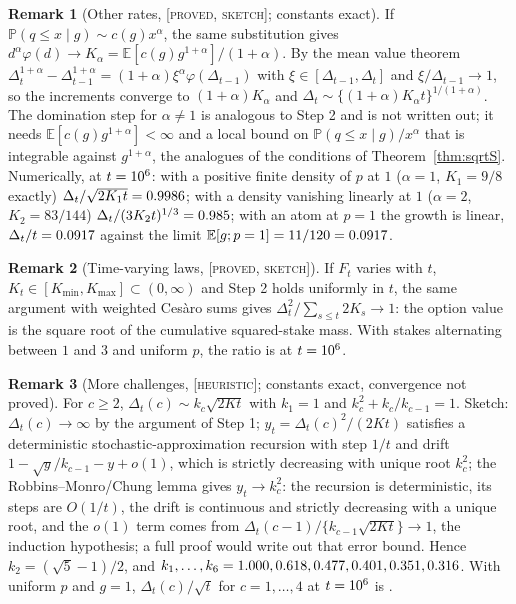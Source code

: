 \documentclass[aoas]{imsart}
\theoremstyle{plain}
\theoremstyle{definition}
\newtheorem{remark}{Remark}
\newcommand{\E}{\mathbb{E}}
\newcommand{\Prob}{\mathbb{P}}
\newcommand{\status}[1]{\textup{[\textsc{#1}]}}
\begin{document}
\begin{remark}[Other rates, \status{proved, sketch}; constants exact]\label{rem:alpha}
If $\Prob(q\le x\mid g)\sim c(g)x^\alpha$, the same substitution gives $d^\alpha\varphi(d)\to K_\alpha=\E[c(g)
g^{1+\alpha}]/(1+\alpha)$. By the mean value theorem $\Delta_t^{1+\alpha}-\Delta_{t-1}^{1+\alpha}=(1+\alpha)
\xi^\alpha\varphi(\Delta_{t-1})$ with $\xi\in[\Delta_{t-1},\Delta_t]$ and $\xi/\Delta_{t-1}\to1$, so the increments
converge to $(1+\alpha)K_\alpha$ and $\Delta_t\sim\{(1+\alpha)K_\alpha t\}^{1/(1+\alpha)}$. The domination step for
$\alpha\ne1$ is analogous to Step 2 and is not written out; it needs $\E[c(g)g^{1+\alpha}]<\infty$ and a local bound on
$\Prob(q\le x\mid g)/x^\alpha$ that is integrable against $g^{1+\alpha}$, the analogues of the conditions of
Theorem~\ref{thm:sqrtS}. Numerically, at $t=10^{6}$: with a positive finite density
of $p$ at $1$ ($\alpha=1$, $K_1=9/8$ exactly) $\Delta_t/\sqrt{2K_1t}=0.9986$; with a density vanishing linearly at
$1$ ($\alpha=2$, $K_2=83/144$) $\Delta_t/(3K_2t)^{1/3}=0.985$; with an atom at $p=1$ the growth is linear,
$\Delta_t/t=0.0917$ against the limit $\E[g;p=1]=11/120=\SAtomLimit$.
\end{remark}

\begin{remark}[Time-varying laws, \status{proved, sketch}]
If $F_t$ varies with $t$, $K_t\in[K_{\min},K_{\max}]\subset(0,\infty)$ and Step 2 holds uniformly in $t$, the same
argument with weighted Ces\`aro sums gives $\Delta_t^2/\sum_{s\le t}2K_s\to1$: the option value is the square root of
the cumulative squared-stake mass. With stakes alternating between $1$ and $3$ and uniform $p$, the ratio is
\STimeVarying{} at $t=10^{6}$.
\end{remark}

\begin{remark}[More challenges, \status{heuristic}; constants exact, convergence not proved]\label{rem:kc}
For $c\ge2$, $\Delta_t(c)\sim k_c\sqrt{2Kt}$ with $k_1=1$ and $k_c^2+k_c/k_{c-1}=1$. Sketch: $\Delta_t(c)\to\infty$ by
the argument of Step 1; $y_t=\Delta_t(c)^2/(2Kt)$ satisfies a deterministic stochastic-approximation recursion with
step $1/t$ and drift $1-\sqrt{y}/k_{c-1}-y+o(1)$, which is strictly decreasing with unique root $k_c^2$; the
Robbins--Monro/Chung lemma \citep[e.g.][Ch.~5]{KushnerYin2003} gives $y_t\to k_c^2$: the recursion is
deterministic, its steps are $O(1/t)$, the drift is continuous and strictly decreasing with a unique root, and the
$o(1)$ term comes from $\Delta_t(c-1)/\{k_{c-1}\sqrt{2Kt}\}\to1$, the induction hypothesis; a full proof would write out
that error bound. Hence $k_2=(\sqrt5-1)/2$, and
$k_1,\dots,k_6=1.000, 0.618, 0.477, 0.401, 0.351, 0.316$. With uniform $p$ and $g=1$, $\Delta_t(c)/\sqrt t$ for $c=1,\dots,4$ at $t=10^{6}$ is
\SUniformKc.
\end{remark}
\end{document}
